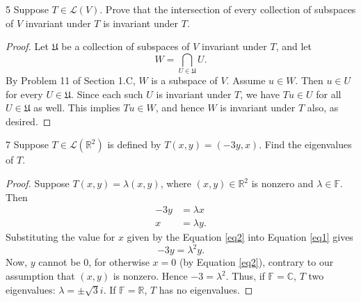 \documentclass{extarticle}
\newenvironment{problem}[1]{\begin{prob*}{#1}{}}{\end{prob*}}
\newcommand{\R}{\mathbb{R}}
\newcommand{\C}{\mathbb{C}}
\newcommand{\F}{\mathbb{F}}
\newcommand{\Hom}{\mathcal{L}}
\begin{document}
\begin{problem}{5}
Suppose $T\in\Hom(V)$.  Prove that the intersection of every collection of subspaces of $V$ invariant under $T$ is invariant under $T$.
\end{problem}
\begin{proof}
Let $\mathfrak{U}$ be a collection of subspaces of $V$ invariant under $T$, and let 
\begin{equation*}
W = \bigcap_{U\in\mathfrak{U}} U.
\end{equation*}
By Problem 11 of Section 1.C, $W$ is a subspace of $V$.  Assume $u\in W$.  Then $u \in U$ for every $U\in\mathfrak{U}$.  Since each such $U$ is invariant under $T$, we have $Tu\in U$ for all $U\in\mathfrak{U}$ as well.  This implies $Tu\in W$, and hence $W$ is invariant under $T$ also, as desired.
\end{proof}

\begin{problem}{7}
Suppose $T\in\Hom(\R^2)$ is defined by $T(x,y)=(-3y,x)$.  Find the eigenvalues of $T$.
\end{problem}
\begin{proof}
Suppose $T(x,y) = \lambda(x,y)$, where $(x, y) \in\R^2$ is nonzero and $\lambda\in\F$.  Then
\begin{align}
-3y &= \lambda x \label{eq1}\\
x &= \lambda y. \label{eq2}
\end{align}
Substituting the value for $x$ given by the Equation \ref{eq2} into Equation \ref{eq1} gives
\begin{equation*}
-3y = \lambda^2y.
\end{equation*}
Now, $y$ cannot be $0$, for otherwise $x=0$ (by Equation \ref{eq2}), contrary to our assumption that $(x,y)$ is nonzero.  Hence $-3 = \lambda ^2$.  Thus, if $\F = \C$, $T$ two eigenvalues: $\lambda = \pm \sqrt{3}i$.  If $\F = \R$, $T$ has no eigenvalues.
\end{proof}
\end{document}
